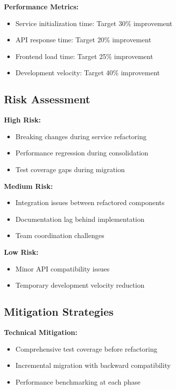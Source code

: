 \documentclass[10pt]{article}
\begin{document}
\textbf{Performance Metrics:}
\begin{itemize}
    \item Service initialization time: Target 30\% improvement
    \item API response time: Target 20\% improvement
    \item Frontend load time: Target 25\% improvement
    \item Development velocity: Target 40\% improvement
\end{itemize}

\subsection{Risk Assessment}

\textbf{High Risk:}
\begin{itemize}
    \item Breaking changes during service refactoring
    \item Performance regression during consolidation
    \item Test coverage gaps during migration
\end{itemize}

\textbf{Medium Risk:}
\begin{itemize}
    \item Integration issues between refactored components
    \item Documentation lag behind implementation
    \item Team coordination challenges
\end{itemize}

\textbf{Low Risk:}
\begin{itemize}
    \item Minor API compatibility issues
    \item Temporary development velocity reduction
\end{itemize}

\subsection{Mitigation Strategies}

\textbf{Technical Mitigation:}
\begin{itemize}
    \item Comprehensive test coverage before refactoring
    \item Incremental migration with backward compatibility
    \item Performance benchmarking at each phase
\end{itemize}
\end{document}
